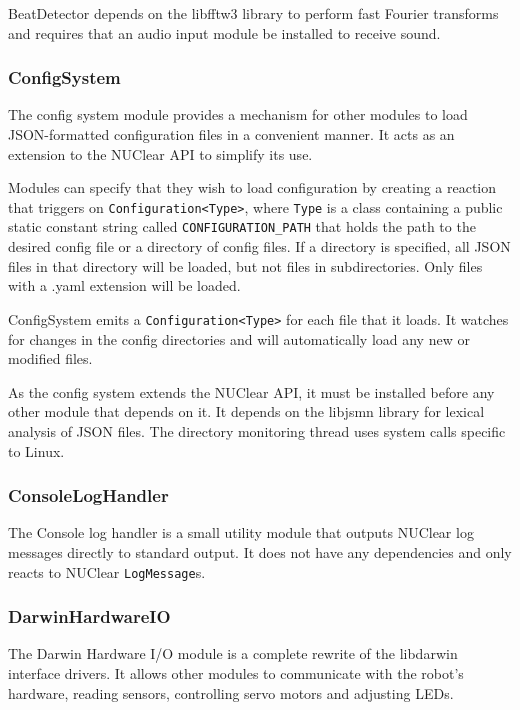 \documentclass[english,12pt]{scrartcl}
\begin{document}
				BeatDetector depends on the libfftw3 library to perform fast Fourier transforms
				and requires that an audio input module be installed to receive sound.


			\subsubsection{ConfigSystem}
				The config system module provides a mechanism for other modules to load
				JSON-formatted configuration files in a convenient manner. It acts as an
				extension to the NUClear API to simplify its use.

				Modules can specify that they wish to load configuration by creating a reaction
				that triggers on \texttt{Configuration<Type>}, where \texttt{Type} is a class
				containing a public static constant string called \texttt{CONFIGURATION\_PATH}
				that holds the path	to the desired config file or a directory of config files. If
				a directory is specified, all JSON files in that directory will be loaded, but
				not files in subdirectories. Only files with a .yaml extension will be loaded.

				ConfigSystem emits a \texttt{Configuration<Type>} for each file that it loads. It
				watches for changes in the config directories and will automatically load any new
				or modified files.

				As the config system extends the NUClear API, it must be installed before any
				other module that depends on it. It depends on the libjsmn library for lexical
				analysis of JSON files. The directory monitoring thread uses system calls
				specific to Linux.


			\subsubsection{ConsoleLogHandler}
				The Console log handler is a small utility module that outputs NUClear log
				messages directly to standard output. It does not have any dependencies and
				only reacts to NUClear \texttt{LogMessage}s.


			\subsubsection{DarwinHardwareIO}
				The Darwin Hardware I/O module is a complete rewrite of the libdarwin interface
				drivers. It allows other modules to communicate with the robot's hardware, reading
				sensors, controlling servo motors and adjusting LEDs.
\end{document}
